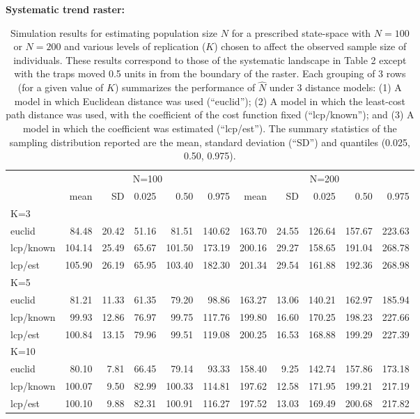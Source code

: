 \documentclass[12pt]{article}
\begin{document}
\begin{spacing}{1.2}
\begin{table}
{\small
\caption{Simulation results for estimating population size $N$ for a prescribed state-space with
$N=100$ or $N=200$ and various levels of replication ($K$) chosen to affect the observed sample
size of individuals. These results correspond to those of the
systematic landscape in Table 2 except with the traps
moved 0.5 units in from the boundary of the raster.
Each grouping of 3 rows (for a given value of $K$) summarizes the
performance of $\hat{N}$ under 3 distance models: (1) A model in which
Euclidean distance was used (``euclid''); (2) A model in which the
least-cost path distance was used, with the coefficient of the cost
function fixed (``lcp/known''); and (3) A model in which the
coefficient was estimated (``lcp/est''). The summary statistics of the
sampling distribution reported are the mean, standard deviation
(``SD'') and quantiles (0.025, 0.50, 0.975).
}
{\bf Systematic trend raster:} \\
\begin{tabular}{l|rrrrr|rrrrr}
         & \multicolumn{5}{c}{N=100   } & \multicolumn{5}{c}{N=200  }  \\
         &   mean &  SD  & 0.025 & 0.50 & 0.975  & mean  & SD   & 0.025 & 0.50  & 0.975 \\ \hline
K=3      &        &      &       &      &        &       &      &       &       &       \\
euclid   &   84.48& 20.42& 51.16 & 81.51& 140.62 &163.70 &24.55 &126.64 &157.67 &223.63 \\
lcp/known&  104.14& 25.49& 65.67 &101.50& 173.19 &200.16 &29.27 &158.65 &191.04 &268.78\\
lcp/est  &  105.90& 26.19& 65.95 &103.40& 182.30 &201.34 &29.54 &161.88 &192.36 &268.98\\
K=5      &        &      &       &      &        &       &      &       &       &       \\
euclid   & 81.21  &11.33 &61.35  &79.20 & 98.86  &163.27 &13.06 &140.21 &162.97 &185.94\\
lcp/known& 99.93  &12.86 &76.97  &99.75 &117.76  &199.80 &16.60 &170.25 &198.23 &227.66\\
lcp/est  & 100.84 &13.15 &79.96  &99.51 &119.08  &200.25 &16.53 &168.88 &199.29 &227.39\\
K=10     &        &      &       &      &        &       &      &       &       &       \\
euclid   &  80.10 & 7.81 &66.45  &79.14 &93.33   &158.40 & 9.25 &142.74 &157.86 &173.18\\
lcp/known& 100.07 & 9.50 &82.99  &100.33&114.81  &197.62 &12.58 &171.95 &199.21 &217.19\\
lcp/est  & 100.10 & 9.88 &82.31  &100.91&116.27  &197.52 &13.03 &169.49 &200.68 &217.82\\ \hline
\end{tabular}
}
\label{tab.results3}
\end{table}







\end{spacing}
\end{document}
